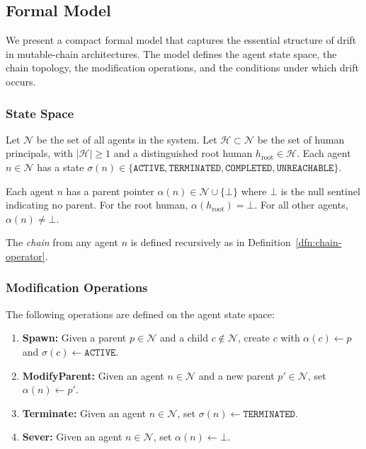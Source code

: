 \subsection{Formal Model}
\label{sec:drift-formal-model}

We present a compact formal model that captures the essential structure of drift in mutable-chain architectures. The model defines the agent state space, the chain topology, the modification operations, and the conditions under which drift occurs.

\subsubsection{State Space}

Let $\mathcal{N}$ be the set of all agents in the system. Let $\mathcal{H} \subset \mathcal{N}$ be the set of human principals, with $|\mathcal{H}| \geq 1$ and a distinguished root human $h_{\text{root}} \in \mathcal{H}$. Each agent $n \in \mathcal{N}$ has a state $\sigma(n) \in \{\texttt{ACTIVE}, \texttt{TERMINATED}, \texttt{COMPLETED}, \texttt{UNREACHABLE}\}$.

Each agent $n$ has a parent pointer $\alpha(n) \in \mathcal{N} \cup \{\bot\}$ where $\bot$ is the null sentinel indicating no parent. For the root human, $\alpha(h_{\text{root}}) = \bot$. For all other agents, $\alpha(n) \neq \bot$.

The \emph{chain} from any agent $n$ is defined recursively as in Definition~\ref{dfn:chain-operator}.

\subsubsection{Modification Operations}

The following operations are defined on the agent state space:

\begin{enumerate}
    \item[(M1)] \textbf{Spawn:} Given a parent $p \in \mathcal{N}$ and a child $c \notin \mathcal{N}$, create $c$ with $\alpha(c) \leftarrow p$ and $\sigma(c) \leftarrow \texttt{ACTIVE}$.
    \item[(M2)] \textbf{ModifyParent:} Given an agent $n \in \mathcal{N}$ and a new parent $p' \in \mathcal{N}$, set $\alpha(n) \leftarrow p'$.
    \item[(M3)] \textbf{Terminate:} Given an agent $n \in \mathcal{N}$, set $\sigma(n) \leftarrow \texttt{TERMINATED}$.
    \item[(M4)] \textbf{Sever:} Given an agent $n \in \mathcal{N}$, set $\alpha(n) \leftarrow \bot$.
\end{enumerate}

